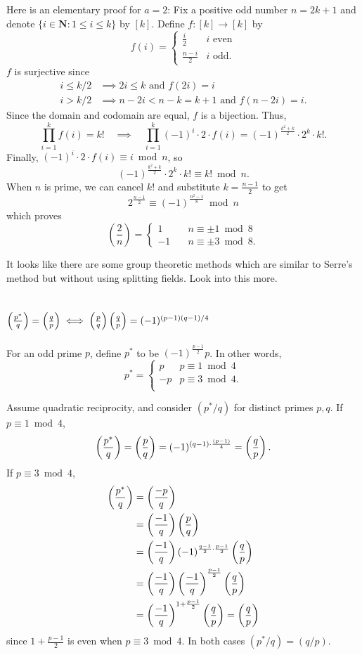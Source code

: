 Here is an elementary proof for $a=2$: Fix a positive odd number $n = 2k+1$ and denote $\{i\in\mathbf{N} : 1\leq i\leq k\}$ by $[k]$.
Define $f:[k]\to[k]$ by
\[f(i) =
  \begin{cases}
    \frac{i}{2} &i\text{ even}\\
    \frac{n-i}{2} &i\text{ odd}.
  \end{cases}
\]
$f$ is surjective since
\begin{align*}
  i\leq k/2 &\implies 2i\leq k\text{ and }f(2i) = i\\
  i > k/2 &\implies n-2i < n-k = k+1\text{ and }f(n-2i) = i.
\end{align*}
Since the domain and codomain are equal, $f$ is a bijection. Thus,
\[\prod_{i=1}^k f(i) = k!\quad\implies\quad\prod_{i=1}^k (-1)^i\cdot 2\cdot f(i) = (-1)^\frac{k^2 + k}{2}\cdot 2^k\cdot k!.\]
Finally, $(-1)^i\cdot 2\cdot f(i)\equiv i\bmod n$, so
\[(-1)^\frac{k^2 + k}{2}\cdot 2^k\cdot k!\equiv k!\bmod n.\]
When $n$ is prime, we can cancel $k!$ and substitute $k=\frac{n-1}{2}$ to get
\[2^\frac{n-1}{2}\equiv (-1)^\frac{n^2 - 1}{8}\bmod n\]
which proves
\[\left(\frac{2}{n}\right) =
  \begin{cases}
     1 &\quad n\equiv\pm 1\bmod 8\\
    -1 &\quad n\equiv\pm 3\bmod 8.
  \end{cases}
\]

It looks like there are some group theoretic methods which are similar to Serre's method but without using splitting fields. Look into this more.

\section{$\left(\frac{p^*}{q}\right)=\left(\frac{q}{p}\right)\iff \left(\frac{p}{q}\right)\left(\frac{q}{p}\right)=(-1)^{(p-1)(q-1)/4}$}

For an odd prime $p$, define $p^*$ to be $(-1)^\frac{p-1}{2} p$. In other words,
\[p^*=
\begin{cases}
  p&p\equiv 1\bmod 4\\
  -p&p\equiv 3\bmod 4.\\
\end{cases}
\]

Assume quadratic reciprocity, and consider $(p^*/q)$ for distinct primes $p, q$. If $p\equiv 1\bmod 4$,
\[\left(\frac{p^*}{q}\right) = \left(\frac{p}{q}\right) = (-1)^{(q-1)\cdot\frac{(p-1)}{4}} = \left(\frac{q}{p}\right).\]
If $p\equiv 3\bmod 4$,
\begin{align*}
  \left(\frac{p^*}{q}\right) &= \left(\frac{-p}{q}\right)\\
                  &= \left(\frac{-1}{q}\right)\left(\frac{p}{q}\right)\\
                  &= \left(\frac{-1}{q}\right)(-1)^{\frac{q-1}{2}\cdot\frac{p-1}{2}}\left(\frac{q}{p}\right)\\
                  &= \left(\frac{-1}{q}\right)\left(\frac{-1}{q}\right)^\frac{p-1}{2}\left(\frac{q}{p}\right)\\
                  &= \left(\frac{-1}{q}\right)^{1+\frac{p-1}{2}}\left(\frac{q}{p}\right) = \left(\frac{q}{p}\right)
\end{align*}
since $1+\frac{p-1}{2}$ is even when $p\equiv 3\bmod 4$. In both cases $(p^*/q)=(q/p)$.

